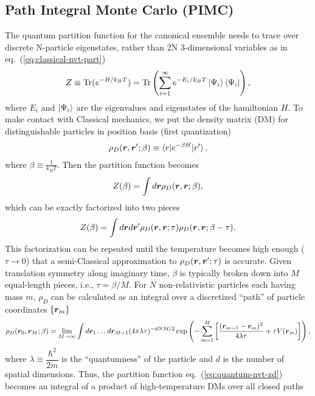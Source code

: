 \subsection{Path Integral Monte Carlo (PIMC)}
The quantum partition function for the canonical ensemble needs to trace over discrete N-particle eigenstates, rather than 2N 3-dimensional variables as in eq.~(\ref{eq:classical-nvt-part})
\begin{align}
Z\equiv \text{Tr}(e^{-H/k_BT})=\text{Tr}\left(
\sum\limits_{i=1}^{\infty} e^{-E_i/k_BT}\ket{\Psi_i}\bra{\Psi_i}
\right),
\end{align}
where $E_i$ and $\ket{\Psi_i}$ are the eigenvalues and eigenstates of the hamiltonian $H$. To make contact with Classical mechanics, we put the density matrix (DM) for distinguishable particles in position basis (first quantization)
\begin{align}
\rho_D(\boldsymbol{r}, \boldsymbol{r}'; \beta) \equiv \braket{r|e^{-\beta H}|r'},
\end{align}
where $\beta\equiv \frac{1}{k_B T}$. 
Then the partition function becomes
\begin{align} \label{eq:quantum-nvt-zd}
Z(\beta) = \int d\boldsymbol{r} \rho_D(\boldsymbol{r},\boldsymbol{r};\beta),
\end{align}
which can be exactly factorized into two pieces
\begin{align}
Z(\beta) = \int d\boldsymbol{r}d\boldsymbol{r}' \rho_D(\boldsymbol{r},\boldsymbol{r};\tau)\rho_D(\boldsymbol{r},\boldsymbol{r};\beta-\tau).
\end{align}
This factorization can be repeated until the temperature becomes high enough ($\tau\rightarrow0$) that a semi-Classical approximation to $\rho_D(\boldsymbol{r},\boldsymbol{r}';\tau)$ is accurate. Given translation symmetry along imaginary time, $\beta$ is typically broken down into $M$ equal-length pieces, i.e., $\tau=\beta/M$.
For $N$ non-relativistic particles each having mass $m$, $\rho_D$ can be calculated as an integral over a discretized ``path'' of particle coordinates $\{\boldsymbol{r}_m\}$
\begin{align} \label{eq:pimc-rhod}
\rho_D(\boldsymbol{r}_0,\boldsymbol{r}_M;\beta) = \lim\limits_{M\rightarrow\infty} \int d\boldsymbol{r}_1\dots d\boldsymbol{r}_{M-1}
(4\pi\lambda\tau)^{-dNM/2}\exp\left(
-\sum\limits_{m=1}^M \left[
\dfrac{(\boldsymbol{r}_{m-1}-\boldsymbol{r}_m)^2}{4\lambda\tau} + \tau V(\boldsymbol{r}_m)
\right]
\right),
\end{align}
where $\lambda\equiv\dfrac{\hbar^2}{2m}$ is the ``quantumness'' of the particle and $d$ is the number of spatial dimensions. Thus, the partition function eq.~(\ref{eq:quantum-nvt-zd}) becomes an integral of a product of high-temperature DMs over all closed paths
